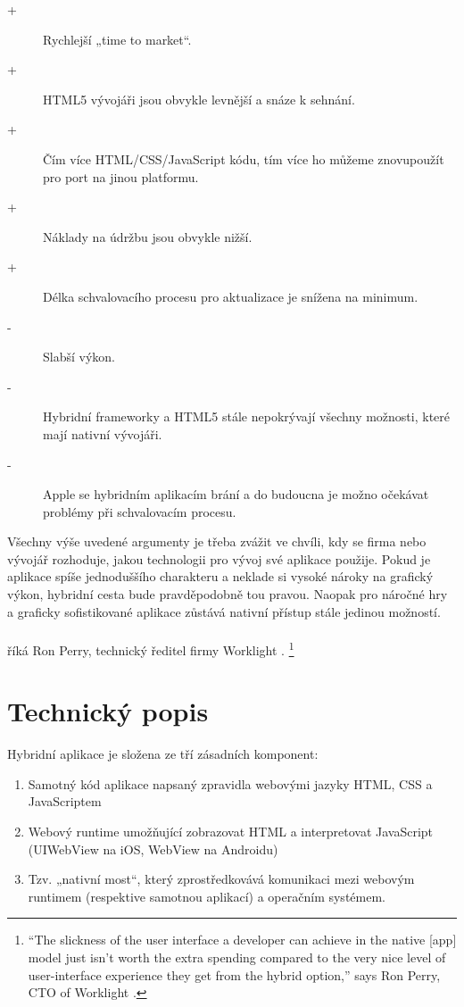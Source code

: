 \begin{description}
        \item[+] Rychlejší „time to market“.
        \item[+] HTML5 vývojáři jsou obvykle levnější a snáze k sehnání.
        \item[+] Čím více HTML/CSS/JavaScript kódu, tím více ho můžeme znovupoužít pro port na jinou platformu.
        \item[+] Náklady na údržbu jsou obvykle nižší.
        \item[+] Délka schvalovacího procesu pro aktualizace je snížena na minimum.
        \item[-] Slabší výkon.
        \item[-] Hybridní frameworky a HTML5 stále nepokrývají všechny možnosti, které mají nativní vývojáři.
        \item[-] Apple se hybridním aplikacím brání a do budoucna je možno očekávat problémy při schvalovacím procesu.
\end{description}

Všechny výše uvedené argumenty je třeba zvážit ve chvíli, kdy se firma nebo vývojář rozhoduje, jakou technologii pro vývoj své aplikace použije. Pokud je aplikace spíše jednoduššího charakteru a neklade si vysoké nároky na grafický výkon, hybridní cesta bude pravděpodobně tou pravou. Naopak pro náročné hry a graficky sofistikované aplikace zůstává nativní přístup stále jedinou možností.\\ \\
\textit{} říká Ron Perry, technický ředitel firmy Worklight \cite{hybrid_app_technology_overview}.
\footnote{“The slickness of the user interface a developer can achieve in the native [app] model just isn’t worth the extra spending compared to the very nice level of user-interface experience they get from the hybrid option,” says Ron Perry, CTO of Worklight \cite{hybrid_app_technology_overview}.}

\section{Technický popis} \label{Sec:TechnickyPopis}
Hybridní aplikace je složena ze tří zásadních komponent:

\begin{enumerate}
	\item Samotný kód aplikace napsaný zpravidla webovými jazyky HTML, CSS a JavaScriptem
	\item Webový runtime umožňující zobrazovat HTML a interpretovat JavaScript (UIWebView na iOS, WebView na Androidu)
	\item Tzv. „nativní most“, který zprostředkovává komunikaci mezi webovým runtimem (respektive samotnou aplikací) a operačním systémem.
\end{enumerate}

